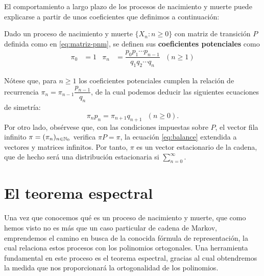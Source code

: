     El comportamiento a largo plazo de los procesos de nacimiento y muerte puede explicarse a partir de unos coeficientes que definimos a continuación:

    \begin{definicion}
        Dado un proceso de nacimiento y muerte $\{X_n:n\geq 0\}$ con matriz de transición $P$ definida como en \eqref{eq:matriz-pnm}, se definen sus \textbf{coeficientes potenciales} como
        \begin{align}
            \label{eq:coeficientes-potenciales}
            \pi_0&= 1 & \pi_n &= \dfrac{p_0 p_1 \cdots p_{n-1}}{q_1 q_2 \cdots q_n} \ \ \ (n\geq 1)
        \end{align}
    \end{definicion}
    Nótese que, para $n\geq 1$ los coeficientes potenciales cumplen la relación de recurrencia $\pi_n = \pi_{n-1} \dfrac{p_{n-1}}{q_n}$, de la cual podemos deducir las siguientes ecuaciones de simetría:
    \begin{equation}
        \label{eq:ecs-simetria}
        \pi_n p_n = \pi_{n+1}q_{n+1} \ \ \ (n\geq 0).
    \end{equation} 
    Por otro lado, obsérvese que, con las condiciones impuestas sobre $P$, el vector fila infinito $\pi = (\pi_n)_{n\in\mathbb{N}_0}$ verifica $\pi P = \pi$, la ecuación \eqref{eq:balance} extendida a vectores y matrices infinitos. Por tanto, $\pi$ es un vector estacionario de la cadena, que de hecho será una distribución estacionaria si $\sum_{n=0}^\infty$.



    \section{El teorema espectral}

    Una vez que conocemos qué es un proceso de nacimiento y muerte, que como hemos visto no es más que un caso particular de cadena de Markov, emprendemos el camino en busca de la conocida fórmula de representación, la cual relaciona estos procesos con los polinomios ortogonales. Una herramienta fundamental en este proceso es el teorema espectral, gracias al cual obtendremos la medida que nos proporcionará la ortogonalidad de los polinomios.


